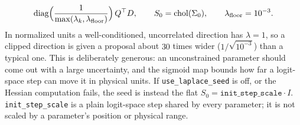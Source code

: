 \documentclass[11pt]{article}
\newcommand{\code}[1]{\texttt{#1}}
\begin{document}
\begin{itemize}
\begin{equation}
      \operatorname{diag}\!\Big(\frac{1}{\max(\lambda_k,\lambda_{\rm floor})}\Big)\,Q^\top D,
      \qquad S_0=\operatorname{chol}(\Sigma_0),\qquad \lambda_{\rm floor}=10^{-3}.
    \end{equation}
    In normalized units a well-conditioned, uncorrelated direction has $\lambda=1$, so a
    clipped direction is given a proposal about $30$ times wider ($1/\sqrt{10^{-3}}$) than
    a typical one. This is deliberately generous: an unconstrained parameter should come
    out with a large uncertainty, and the sigmoid map bounds how far a logit-space step can
    move it in physical units. If \code{use\_laplace\_seed} is off, or the Hessian
    computation fails, the seed is instead the flat $S_0=\code{init\_step\_scale}\cdot I$.
    \code{init\_step\_scale} is a plain logit-space step shared by every parameter; it is
    not scaled by a parameter's position or physical range.


\end{itemize}
\end{document}
